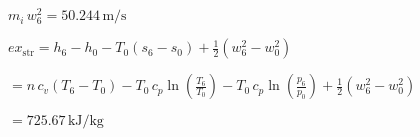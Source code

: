 \( m_i \, w_6^2 = 50.244 \, \text{m/s} \)  

\( ex_{\text{str}} = h_6 - h_0 - T_0 (s_6 - s_0) + \frac{1}{2} (w_6^2 - w_0^2) \)  

\( = n \, c_v (T_6 - T_0) - T_0 \, c_p \ln \left( \frac{T_6}{T_0} \right) - T_0 \, c_p \ln \left( \frac{p_6}{p_0} \right) + \frac{1}{2} (w_6^2 - w_0^2) \)  

\( = 725.67 \, \text{kJ/kg} \)